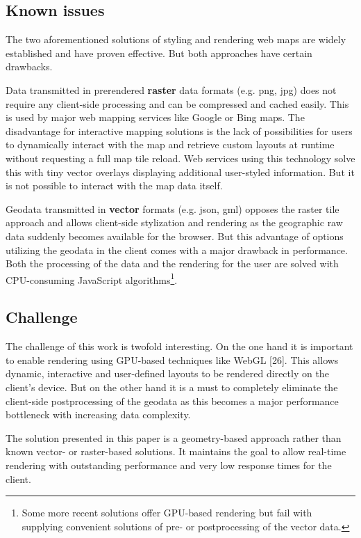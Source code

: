 \documentclass{motivation}
\begin{document}
\subsection{Known issues}
  The two aforementioned solutions of styling and rendering web maps are widely established and have proven effective. But both approaches have certain drawbacks.\par
  Data transmitted in prerendered \textbf{raster} data formats (e.g. png, jpg) does not require any client-side processing and can be compressed and cached easily. This is used by major web mapping services like Google or Bing maps. The disadvantage for interactive mapping solutions is the lack of possibilities for users to dynamically interact with the map and retrieve custom layouts at runtime without requesting a full map tile reload. Web services using this technology solve this with tiny vector overlays displaying additional user-styled information. But it is not possible to interact with the map data itself.\par
  Geodata transmitted in \textbf{vector} formats (e.g. json, gml) opposes the raster tile approach and allows client-side stylization and rendering as the geographic raw data suddenly becomes available for the browser. But this advantage of options utilizing the geodata in the client comes with a major drawback in performance. Both the processing of the data and the rendering for the user are solved with CPU-consuming JavaScript algorithms\footnote{Some more recent solutions offer GPU-based rendering but fail with supplying convenient solutions of pre- or postprocessing of the vector data.}.

\subsection{Challenge}
  The challenge of this work is twofold interesting. On the one hand it is important to enable rendering using GPU-based techniques like WebGL [26]. This allows dynamic, interactive and user-defined layouts to be rendered directly on the client's device. But on the other hand it is a must to completely eliminate the client-side postprocessing of the geodata as this becomes a major performance bottleneck with increasing data complexity.\par
  The solution presented in this paper is a geometry-based approach rather than known vector- or raster-based solutions. It maintains the goal to allow real-time rendering with outstanding performance and very low response times for the client.
\end{document}

